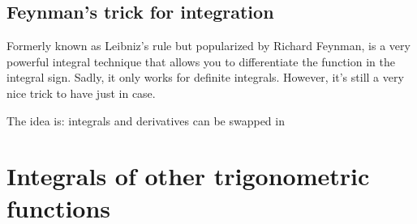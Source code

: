 \subsection{Feynman's trick for integration}

Formerly known as Leibniz's rule but popularized by Richard Feynman, is a very powerful integral technique that allows you to differentiate the function in the integral sign. Sadly, it only works for definite integrals. However, it's still a very nice trick to have just in case.

The idea is: integrals and derivatives can be swapped in

\section{Integrals of other trigonometric functions}
